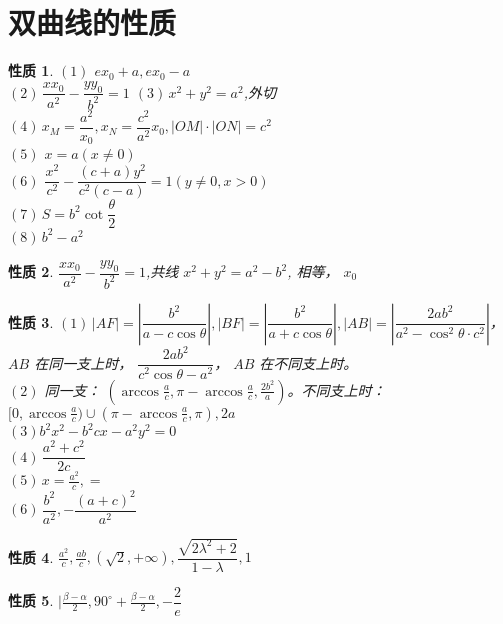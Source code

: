 \documentclass[a4paper,10pt,twoside]{article}
\newtheorem{proposition}{性质}
\begin{document}
\section{双曲线的性质}
\begin{proposition}
     $ (1) $  $ ex_0+a,ex_0-a $ \\ $  (2) \, \dfrac{xx_0 }{a^2 }-\dfrac{yy_0 }{b^2 }=1$  \qquad $ (3)\, x^2+y^2=a^2  $,外切\\ $ (4) \, x_M=\dfrac{a^2 }{x_0 },x_N =\dfrac{c^2 }{a^2 }x_0 ,|OM|\cdot |ON|=c^2 $\\
      $ (5)  $  $ x=a(x\not=0) $ \\
       $ (6) $  $ \dfrac{x^2 }{c^2 }-\dfrac{(c+a)y^2 }{c^2(c-a) }=1(y\not=0,x>0 ) $\\
        $ (7) \,S=b^2\cot \dfrac{\theta }{2 } $  \\
         $ (8 )\, b^2-a^2 $   
\end{proposition}
\begin{proposition}
     $ \dfrac{xx_0 }{a^2 }-\dfrac{yy_0 }{b^2 }=1 $,共线 $ x^2+y^2=a^2-b^2  $,  相等， $ x_0 $   
\end{proposition}
\begin{proposition}
     $ (1)\,|AF|=\left|\dfrac{b^2}{a-c\cos\theta}\right| ,|BF|=\left|\dfrac{b^2}{a+c\cos\theta}\right|,|AB|=\left|\dfrac{2ab^2 }{a^2-\cos^2\theta \cdot c^2}\right|  $， $ AB $ 在同一支上时， $ \dfrac{2ab^2 }{c^2\cos \theta -a^2 } $， $ AB  $ 在不同支上时。\\

      $ (2)  $ 同一支： $ (\arccos\frac{a }{c },\pi-\arccos\frac{a }{c },\frac{2b^2 }{a}) $。不同支上时： $ [0,\arccos \frac{a }{c })\cup(\pi-\arccos \frac{ a }{c },\pi ),2a $\\
       $ (3)b^2x^2-b^2cx-a^2y^2=0 $ \\ $ (4)\, \dfrac{a^2+c^2 }{2c } $\\ $ (5) \, x=\frac{a ^2 }{c },=  $ 
       \\ $ (6)\, \dfrac{ b^2 }{a^2 },-\dfrac{(a+c)^2 }{a^2 } $   
\end{proposition}
\begin{proposition}
     $ \frac{a^2 }{c },\frac{ab }{c },(\sqrt{2 },+\infty),\dfrac{\sqrt{2\lambda^2+2 }}{1-\lambda},1 $ 
\end{proposition}
\begin{proposition}
     $ |\frac{\beta -\alpha }{2 },90^{\circ }+\frac{\beta-\alpha }{2},-\dfrac{2 }{e } $ 
\end{proposition}
\end{document}
